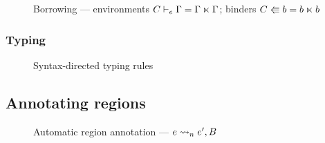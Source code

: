 \begin{figure}[tp]
  
  \caption{Borrowing --- environments $C \vdash_e \Gamma = \Gamma \ltimes \Gamma$; binders $C \Lleftarrow b = b \ltimes b$}
  \label{fig:sd-borrowing}
\end{figure}

\subsubsection{Typing}

\begin{figure*}[htp]
  
  \caption{Syntax-directed typing rules}
  \label{fig:syntax-directed-typing}
\end{figure*}

\clearpage

\subsection{Annotating regions}

\begin{figure*}[htp]
  \centering
  
  \caption{Automatic region annotation --- $e \rightsquigarrow_{n} e', B$}
  \label{fig:region-annotation}
\end{figure*}

